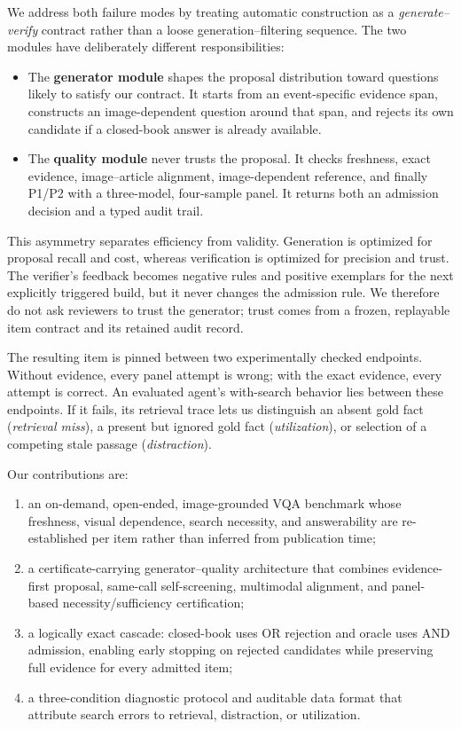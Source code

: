 \documentclass{article}
\begin{document}
We address both failure modes by treating automatic construction as a
\emph{generate--verify} contract rather than a loose generation--filtering
sequence.
The two modules have deliberately different responsibilities:
\begin{itemize}[leftmargin=*,itemsep=2pt]
  \item The \textbf{generator module} shapes the proposal distribution toward
  questions likely to satisfy our contract. It starts from an event-specific
  evidence span, constructs an image-dependent question around that span, and
  rejects its own candidate if a closed-book answer is already available.
  \item The \textbf{quality module} never trusts the proposal. It checks
  freshness, exact evidence, image--article alignment, image-dependent
  reference, and finally P1/P2 with a three-model, four-sample panel.
  It returns both an admission decision and a typed audit trail.
\end{itemize}

This asymmetry separates efficiency from validity.
Generation is optimized for proposal recall and cost, whereas verification is
optimized for precision and trust.
The verifier's feedback becomes negative rules and positive exemplars for the
next explicitly triggered build, but it never changes the admission rule.
We therefore do not ask reviewers to trust the generator; trust comes from a
frozen, replayable item contract and its retained audit record.

The resulting item is pinned between two experimentally checked endpoints.
Without evidence, every panel attempt is wrong; with the exact evidence,
every attempt is correct.
An evaluated agent's with-search behavior lies between these endpoints.
If it fails, its retrieval trace lets us distinguish an absent gold fact
(\emph{retrieval miss}), a present but ignored gold fact
(\emph{utilization}), or selection of a competing stale passage
(\emph{distraction}).

Our contributions are:
\begin{enumerate}[leftmargin=*,itemsep=2pt]
  \item an on-demand, open-ended, image-grounded VQA benchmark whose freshness,
  visual dependence, search necessity, and answerability are re-established
  per item rather than inferred from publication time;
  \item a certificate-carrying generator--quality architecture that combines
  evidence-first proposal, same-call self-screening, multimodal alignment,
  and panel-based necessity/sufficiency certification;
  \item a logically exact cascade: closed-book uses OR rejection and oracle
  uses AND admission, enabling early stopping on rejected candidates while
  preserving full evidence for every admitted item;
  \item a three-condition diagnostic protocol and auditable data format that
  attribute search errors to retrieval, distraction, or utilization.
\end{enumerate}
\end{document}
